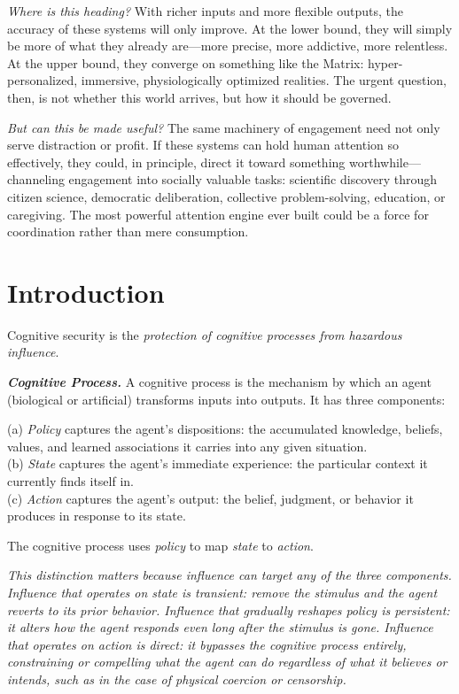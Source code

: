 \documentclass{article}
\begin{document}
\textit{Where is this heading?} With richer inputs and more flexible outputs, the accuracy of these systems will only improve. At the lower bound, they will simply be more of what they already are—more precise, more addictive, more relentless. At the upper bound, they converge on something like the Matrix: hyper-personalized, immersive, physiologically optimized realities. The urgent question, then, is not whether this world arrives, but how it should be governed.

\textit{But can this be made useful?} The same machinery of engagement need not only serve distraction or profit. If these systems can hold human attention so effectively, they could, in principle, direct it toward something worthwhile—channeling engagement into socially valuable tasks: scientific discovery through citizen science, democratic deliberation, collective problem-solving, education, or caregiving. The most powerful attention engine ever built could be a force for coordination rather than mere consumption.



\section{Introduction}
Cognitive security is the \textit{protection of cognitive processes from hazardous influence}.

\textbf{\textit{Cognitive Process.}} A cognitive process is the mechanism by which an agent (biological or artificial) transforms inputs into outputs. It has three components:

(a) \textit{Policy} captures the agent's dispositions: the accumulated knowledge, beliefs, values, and learned associations it carries into any given situation.\\
(b) \textit{State} captures the agent's immediate experience: the particular context it currently finds itself in.\\
(c) \textit{Action} captures the agent's output: the belief, judgment, or behavior it produces in response to its state.

The cognitive process uses \textit{policy} to map \textit{state} to \textit{action}.

\textit{This distinction matters because influence can target any of the three components. Influence that operates on state is transient: remove the stimulus and the agent reverts to its prior behavior. Influence that gradually reshapes policy is persistent: it alters how the agent responds even long after the stimulus is gone. Influence that operates on action is direct: it bypasses the cognitive process entirely, constraining or compelling what the agent can do regardless of what it believes or intends, such as in the case of physical coercion or censorship.}
\end{document}
